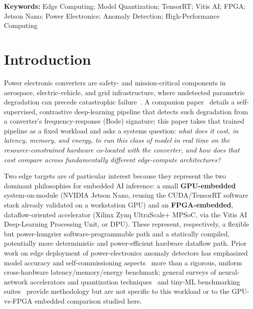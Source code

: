 \documentclass[11pt,a4paper]{article}
\begin{document}
\noindent\textbf{Keywords:} Edge Computing; Model Quantization; TensorRT; Vitis AI;
FPGA; Jetson Nano; Power Electronics; Anomaly Detection; High-Performance Computing

\section{Introduction}
\label{sec:intro}

Power electronic converters are safety- and mission-critical components in aerospace,
electric-vehicle, and grid infrastructure, where undetected parametric degradation can
precede catastrophic failure~\cite{idrisov2025digitaltwin,liu2022review}. A companion
paper~\cite{darban2023carla} details a self-supervised, contrastive deep-learning
pipeline that detects such degradation from a converter's frequency-response (Bode)
signature; this paper takes that trained pipeline as a fixed workload and asks a
systems question: \emph{what does it cost, in latency, memory, and energy, to run this
class of model in real time on the resource-constrained hardware co-located with the
converter, and how does that cost compare across fundamentally different edge-compute
architectures?}

Two edge targets are of particular interest because they represent the two dominant
philosophies for embedded AI inference: a small \textbf{GPU-embedded} system-on-module
(NVIDIA Jetson Nano, reusing the CUDA/TensorRT software stack already validated on a
workstation GPU) and an \textbf{FPGA-embedded}, dataflow-oriented accelerator (Xilinx
Zynq UltraScale+ MPSoC, via the Vitis AI Deep-Learning Processing Unit, or DPU). These
represent, respectively, a flexible but power-hungrier software-programmable path and a
statically compiled, potentially more deterministic and power-efficient hardware
dataflow path. Prior work on edge deployment of power-electronics anomaly detectors has
emphasized model accuracy and self-commissioning aspects~\cite{gomez2023selfcommissioning,beattie2022robust}
more than a rigorous, uniform cross-hardware latency/memory/energy benchmark; general
surveys of neural-network accelerators and quantization
techniques~\cite{sze2017efficient,gholami2021quantsurvey,jacob2018quantization} and
tiny-ML benchmarking suites~\cite{banbury2021mlperftiny} provide methodology but are not
specific to this workload or to the GPU-vs-FPGA embedded comparison studied here.
\end{document}
